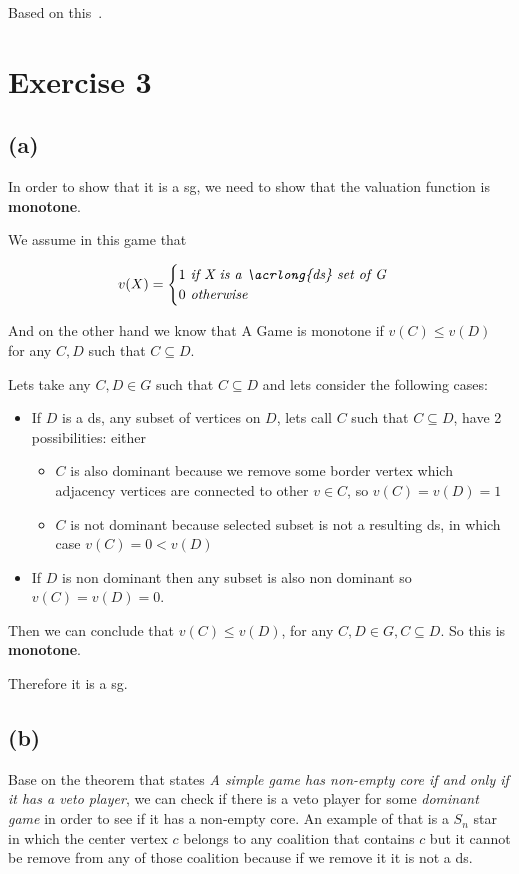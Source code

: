 \documentclass[12pt, a4paper]{article}
\begin{document}
Based on this~\cite{network_creation}.

\section{Exercise 3}
\subsection{(a)}
In order to show that it is a \acrfull{sg}, we need to show that the valuation function is \textbf{monotone}.

We assume in this game that

\[ v(X) = \begin{cases}
  1 \textit{ if X is a \acrlong{ds} set of G}\\
  0 \textit{ otherwise}
\end{cases}
\]

And on the other hand we know that A Game is monotone if $v(C) \leq v(D)$ for any $C, D$ such that $C \subseteq D$.

Lets take any $C,D \in G$ such that $C \subseteq D$ and lets consider the following cases:

\begin{itemize}
  \item If $D$ is a \acrfull{ds}, any subset of vertices on $D$, lets call $C$ such that $C \subseteq D$, have 2 possibilities: either
  \begin{itemize}
    \item $C$ is also dominant because we remove some border vertex which adjacency vertices are connected to other $v \in C$, so $v(C) = v(D) = 1$
    \item $C$ is not dominant because selected subset is not a resulting \acrlong{ds}, in which case $v(C) = 0 < v(D)$
  \end{itemize}
  \item If $D$ is non dominant then any subset is also non dominant so $v(C) = v(D) = 0$.
\end{itemize}

Then we can conclude that $v(C) \leq v(D)$, for any $C, D \in G, C \subseteq D$. So this is \textbf{monotone}.

Therefore it is a \acrshort{sg}.

\subsection{(b)}
Base on the theorem that states \textit{A simple game has non-empty core if and only if it has a veto player}, we can check
if there is a veto player for some \textit{dominant game} in order to see if it has a non-empty core.
An example of that is a $S_n$ star in which the center vertex $c$ belongs to any coalition that contains $c$ but it cannot be remove from any of those 
coalition because if we remove it it is not a \acrlong{ds}.
\end{document}
